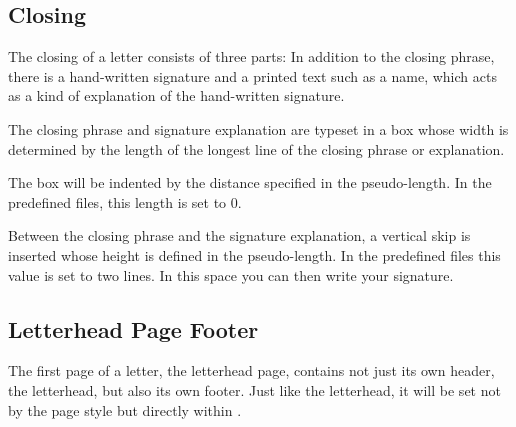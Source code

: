 \subsection{Closing}
\BeginIndexGroup
{}

The closing of a letter consists of three parts: In addition to the closing
phrase, there is a hand-written signature and a printed text such as a name,
which acts as a kind of explanation of the hand-written signature.

\begin{Declaration}
\end{Declaration}
The closing phrase and signature
explanation are typeset in a box whose width is determined by the length of
the longest line of the closing phrase or explanation.

The box will be indented by the distance specified in the 
pseudo-length. In the predefined  files, this length is set to 0.

Between the closing phrase and the signature explanation, a vertical skip is
inserted whose height is defined in the 
pseudo-length. In the predefined  files this value is set to two lines. In this
space you can then write your signature.%
\iffalse%
\ If you decide to include a facsimile of your signature in the
\DescRef{scrlttr2.variable.signature}\IndexVariable{signature}%
\important{\DescRef{scrlttr2.variable.signature}} with the
\Package{graphicx}\IndexPackage{graphicx} package, it would be useful
to reduce the value of \PLength{sigbeforevskip} and thus the gap between
the closing phrase and the signature.%
\fi%
\EndIndexGroup
%
\EndIndexGroup


\subsection{Letterhead Page Footer}
%
\BeginIndexGroup
{}%

The first page of a letter, the letterhead page, contains not just its own
header, the letterhead, but also its own footer. Just like the letterhead, it will be set not by the page
style but directly within %
.

